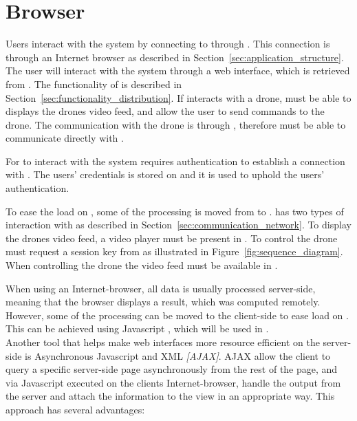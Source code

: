 \section{Browser}
\label{sec:design_client}
Users interact with the system by connecting to  through .
This connection is through an Internet browser as described in Section~\ref{sec:application_structure}.
The user will interact with the system through a web interface, which is retrieved from .
The functionality of  is described in Section~\ref{sec:functionality_distribution}.
If  interacts with a drone,  must be able to displays the drones video feed, and allow the user to send commands to the drone.
The communication with the drone is through , therefore  must be able to communicate directly with .

For  to interact with the system requires authentication to establish a connection with .
The users' credentials is stored on  and it is used to uphold the users' authentication.

To ease the load on , some of the processing is moved from  to .
 has two types of interaction with  as described in Section~\ref{sec:communication_network}.
To display the drones video feed, a video player must be present in .
To control the drone  must request a session key from  as illustrated in Figure~\ref{fig:sequence_diagram}.
When controlling the drone the video feed must be available in .












When using an Internet-browser, all data is usually processed server-side, meaning that the browser displays a result, which was computed remotely.
However, some of the processing can be moved to the client-side to ease load on .
This can be achieved using Javascript \citep{what_is_javascript}, which will be used in \projectname{}. \\

Another tool that helps make web interfaces more resource efficient on the server-side is Asynchronous Javascript and XML \emph{[AJAX]}.
AJAX allow the client to query a specific server-side page asynchronously from the rest of the page, and via Javascript executed on the clients Internet-browser, handle the output from the server and attach the information to the view in an appropriate way.
This approach has several advantages:

